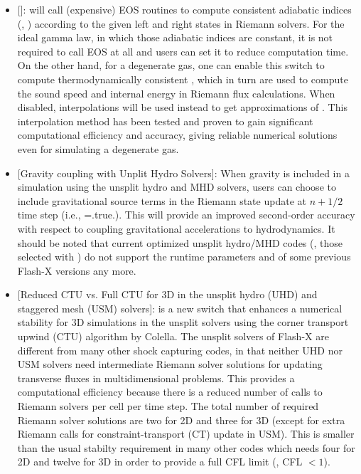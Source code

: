 \begin{itemize}
\item {[]}:  will call (expensive) EOS routines to compute consistent adiabatic indices (\ie, ) according to the given left and right states in Riemann solvers. For the ideal gamma law, in which those adiabatic indices are constant, it is not required to call EOS at all and users can set it  to reduce computation time. On the other hand, for a degenerate gas, one can enable this switch to compute thermodynamically consistent 
, which in turn are used to compute the sound speed and internal energy in Riemann flux calculations. 
When disabled, interpolations will be used instead to get approximations of . This interpolation method has been tested and proven to gain significant
computational efficiency and accuracy, giving reliable numerical solutions even for simulating a degenerate gas.


\item {[Gravity coupling with Unplit Hydro Solvers]}: When gravity is
  included in a simulation using the unsplit hydro and MHD solvers,
  users can choose to include gravitational source terms in the
  Riemann state update at $n+1/2$ time step (i.e.,
  =.true.). This will provide an improved second-order
  accuracy with respect to coupling gravitational accelerations to
  hydrodynamics.
It should be noted that current optimized unsplit hydro/MHD codes (\eg, those selected with ) 
do not support the runtime parameters    and  of
some previous Flash-X versions any more.

\item {[Reduced CTU vs. Full CTU for 3D in the unsplit hydro (UHD) and staggered mesh (USM) solvers]}:
 is a new switch that enhances a numerical stability for 3D simulations in the unsplit solvers
using the corner transport upwind (CTU) algorithm by Colella. 
The unsplit solvers of Flash-X are different from many other shock capturing codes, in that neither UHD nor USM solvers
need intermediate Riemann solver solutions for updating transverse fluxes in multidimensional problems. This provides
a computational efficiency because there is a reduced number of calls to Riemann solvers per cell per time step.
The total number of required Riemann solver solutions are two for 2D and three for 3D (except for extra Riemann calls
for constraint-transport (CT) update in USM). This is smaller than the usual stabilty requirement in many other codes which
needs four for 2D and twelve for 3D in order to provide a full CFL limit (\ie, CFL $<1$). 


\end{itemize}

